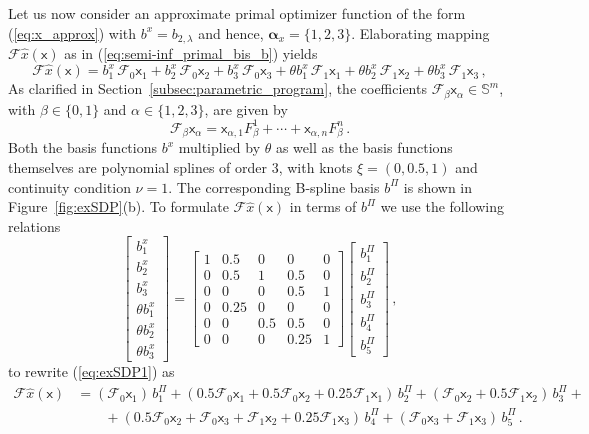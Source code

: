 \documentclass{article}
\renewcommand{\S}{\mathbb{S}}       %
\newcommand{\ppar}{\theta}                          %
\newcommand{\calF}{\mathcal{F}}                     %
\newcommand{\bx}{b^x}               %
\newcommand{\cx}{\textsf{x}}        %
\newcommand{\cxa}{\cx_\alpha}       %
\newcommand{\Alpha}{\bm{\alpha}}    %
\newcommand{\bPi}{b^\Pi}                %
\begin{document}
Let us now consider an approximate primal optimizer function of the form (\ref{eq:x_approx}) with $\bx = b_{2,\lambda}$ and hence, $\Alpha_x=\{1,2,3\}$. Elaborating mapping $\calF \hat{x}(\cx)$ as in (\ref{eq:semi-inf_primal_bis_b}) yields
\begin{equation}\label{eq:exSDP1}
\calF \hat{x}(\cx) = \bx_1 \, \calF_0\cx_1 + \bx_2 \, \calF_0\cx_2 + \bx_3 \, \calF_0\cx_3 + \ppar\bx_1 \, \calF_1\cx_1 + \ppar\bx_2 \, \calF_1\cx_2 + \ppar\bx_3 \, \calF_1\cx_3 \,,%
\end{equation}
As clarified in Section~\ref{subsec:parametric_program}, the coefficients $\calF_\beta \cxa \in \S^m$, with $\beta\in\{0,1\}$ and $\alpha\in\{1,2,3\}$, are given by
\[ \calF_\beta \cxa = \cx_{\alpha,1} F_\beta^1 + \cdots + \cx_{\alpha,n} F_\beta^n \,.%
\]
Both the basis functions $\bx$ multiplied by $\ppar$ as well as the basis functions themselves are polynomial splines of order 3, with knots $\xi = (0, 0.5, 1)$ and continuity condition $\nu = 1$. The corresponding B-spline basis $\bPi$ is shown in Figure~\ref{fig:exSDP}(b). To formulate $\calF \hat{x}(\cx)$ in terms of $\bPi$ we use the following relations
\[ \begin{bmatrix} \bx_1 \\ \bx_2 \\ \bx_3 \\ \ppar\bx_1 \\ \ppar\bx_2 \\ \ppar\bx_3 \end{bmatrix} = %
   \begin{bmatrix} 1 & 0.5  & 0   & 0    & 0 \\
                   0 & 0.5  & 1   & 0.5  & 0 \\
                   0 & 0    & 0   & 0.5  & 1 \\
                   0 & 0.25 & 0   & 0    & 0 \\
                   0 & 0    & 0.5 & 0.5  & 0 \\
                   0 & 0    & 0   & 0.25 & 1 \end{bmatrix}
   \begin{bmatrix} \bPi_1 \\[2pt] \bPi_2 \\[2pt] \bPi_3 \\[2pt]  \bPi_4 \\[2pt] \bPi_5 \end{bmatrix} \,,%
\]
to rewrite (\ref{eq:exSDP1}) as
\[\begin{aligned}
    \calF \hat{x}(\cx) &= (\calF_0\cx_1)\,\bPi_1 + (0.5\calF_0\cx_1 + 0.5\calF_0\cx_2 + 0.25 \calF_1\cx_1)\, \bPi_2 %
                       + (\calF_0\cx_2+0.5\calF_1\cx_2)\,\bPi_3 + \\%
                       &\qquad + (0.5\calF_0\cx_2+\calF_0\cx_3+\calF_1\cx_2+0.25\calF_1\cx_3)\,\bPi_4 %
                       + (\calF_0\cx_3 +\calF_1\cx_3)\,\bPi_5\,.
\end{aligned}\]
\end{document}
